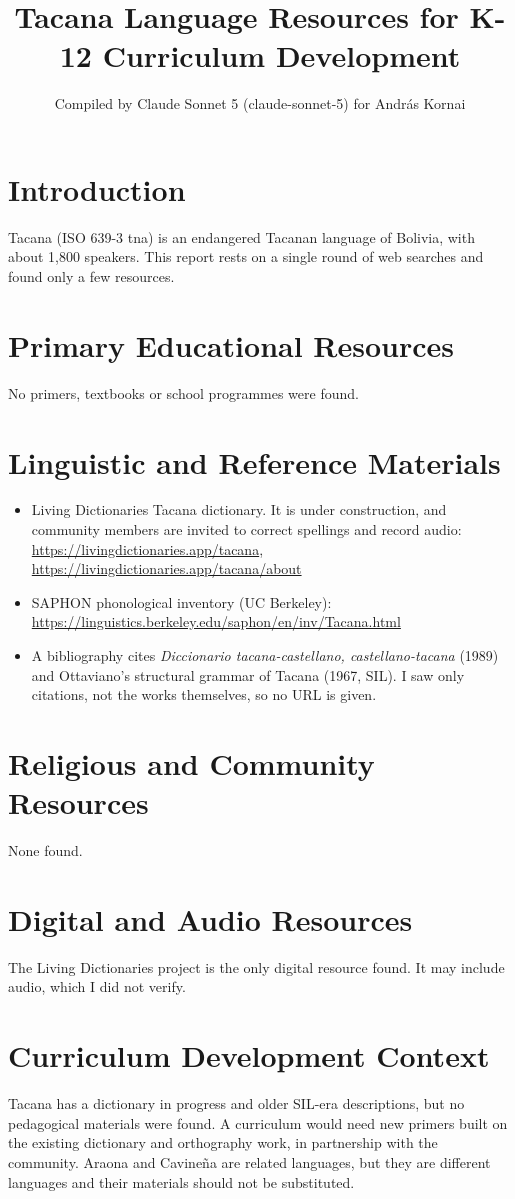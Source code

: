 \documentclass[12pt]{article}
\title{Tacana Language Resources for K-12 Curriculum Development}
\author{Compiled by Claude Sonnet 5 (claude-sonnet-5) for Andr\'as Kornai}
\date{}
\begin{document}
\maketitle

\section{Introduction}
Tacana (ISO 639-3 tna) is an endangered Tacanan language of Bolivia, with about 1,800 speakers. This report rests on a single round of web searches and found only a few resources.

\section{Primary Educational Resources}
No primers, textbooks or school programmes were found.

\section{Linguistic and Reference Materials}
\begin{itemize}
\item Living Dictionaries Tacana dictionary. It is under construction, and community members are invited to correct spellings and record audio: \url{https://livingdictionaries.app/tacana}, \url{https://livingdictionaries.app/tacana/about}
\item SAPHON phonological inventory (UC Berkeley): \url{https://linguistics.berkeley.edu/saphon/en/inv/Tacana.html}
\item A bibliography cites \emph{Diccionario tacana-castellano, castellano-tacana} (1989) and Ottaviano's structural grammar of Tacana (1967, SIL). I saw only citations, not the works themselves, so no URL is given.
\end{itemize}

\section{Religious and Community Resources}
None found.

\section{Digital and Audio Resources}
The Living Dictionaries project is the only digital resource found. It may include audio, which I did not verify.

\section{Curriculum Development Context}
Tacana has a dictionary in progress and older SIL-era descriptions, but no pedagogical materials were found. A curriculum would need new primers built on the existing dictionary and orthography work, in partnership with the community. Araona and Cavine\~na are related languages, but they are different languages and their materials should not be substituted.
\end{document}
